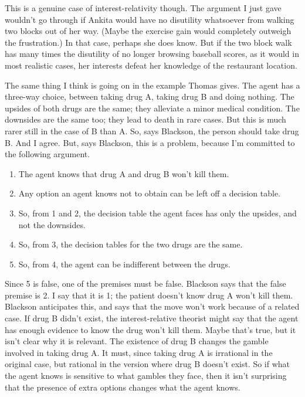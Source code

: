 This is a genuine case of interest-relativity though. The argument I just gave wouldn't go through if Ankita would have no disutility whatsoever from walking two blocks out of her way. (Maybe the exercise gain would completely outweigh the frustration.) In that case, perhaps she does know. But if the two block walk has many times the disutility of no longer browsing baseball scores, as it would in most realistic cases, her interests defeat her knowledge of the restaurant location.

The same thing I think is going on in the example Thomas  \citet{Blackson2015} gives. The agent has a three-way choice, between taking drug A, taking drug B and doing nothing. The upsides of both drugs are the same; they alleviate a minor medical condition. The downsides are the same too; they lead to death in rare cases. But this is much rarer still in the case of B than A. So, says Blackson, the person should take drug B. And I agree. But, says Blackson, this is a problem, because I'm committed to the following argument.

\begin{enumerate}
\item The agent knows that drug A and drug B won't kill them.

\item Any option an agent knows not to obtain can be left off a decision table.

\item So, from 1 and 2, the decision table the agent faces has only the upsides, and not the downsides.

\item So, from 3, the decision tables for the two drugs are the same.

\item So, from 4, the agent can be indifferent between the drugs.

\end{enumerate}
Since 5 is false, one of the premises must be false. Blackson says that the false premise is 2. I say that it is 1; the patient doesn't know drug A won't kill them. Blackson anticipates this, and says that the move won't work because of a related case. If drug B didn't exist, the interest-relative theorist might say that the agent has enough evidence to know the drug won't kill them. Maybe that's true, but it isn't clear why it is relevant. The existence of drug B changes the gamble involved in taking drug A. It must, since taking drug A is irrational in the original case, but rational in the version where drug B doesn't exist. So if what the agent knows is sensitive to what gambles they face, then it isn't surprising that the presence of extra options changes what the agent knows.

